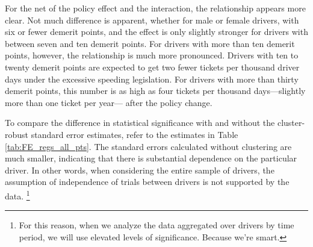 \documentclass[12pt]{paper}
\begin{document}
For the net of the policy effect and the interaction, the relationship appears more clear. 
Not much difference is apparent, whether for male or female drivers, with six or fewer demerit points, 
and the effect is only slightly stronger for drivers with between seven and ten demerit points. 
For drivers with more than ten demerit points, however, the relationship is much more pronounced. 
Drivers with ten to twenty demerit points are expected to get two fewer tickets per thousand driver days
under the excessive speeding legislation. 
For drivers with more than thirty demerit points, 
this number is as high as four tickets per thousand days---slightly more than one ticket per year---%
after the policy change. 




To compare the difference in statistical significance with and without the cluster-robust standard error estimates, 
refer to the estimates in Table \ref{tab:FE_regs_all_pts}. 
The standard errors calculated without clustering are much smaller, 
indicating that there is substantial dependence on the particular driver. 
In other words, when considering the entire sample of drivers, 
the assumption of independence of trials between drivers is not supported by the data.%
\footnote{For this reason, when we analyze the data aggregated over drivers by time period, 
we will use elevated levels of significance. Because we're smart. }




\end{document}
